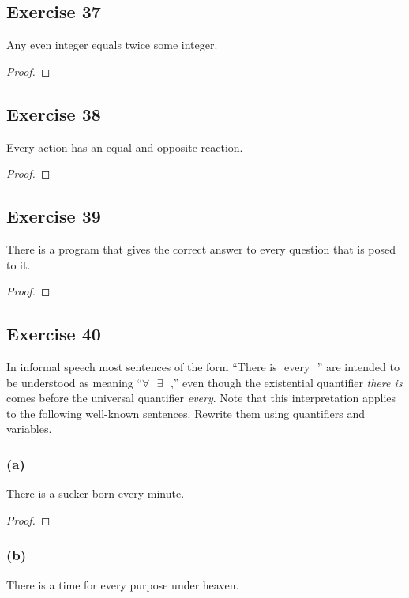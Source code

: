 \documentclass[14pt]{extarticle}
\newcommand{\fbl}{\underline{\hspace{1cm}}\,\,}
\newcommand{\fa}{\forall}
\newcommand{\te}{\exists}
\begin{document}
\subsection{Exercise 37}
Any even integer equals twice some integer.

\begin{proof}

\end{proof}

\subsection{Exercise 38}
Every action has an equal and opposite reaction.

\begin{proof}

\end{proof}

\subsection{Exercise 39}
There is a program that gives the correct answer to every question that is posed to it.

\begin{proof}

\end{proof}

\subsection{Exercise 40}
In informal speech most sentences of the form “There is \fbl every \fbl” are intended to be understood as meaning “$\fa$ \fbl $\te$ \fbl,” even though the existential quantifier {\it there is} comes before the universal quantifier {\it every}. Note that this interpretation applies to the following well-known sentences. Rewrite them using quantifiers and variables.

\subsubsection{(a)}
There is a sucker born every minute.

\begin{proof}

\end{proof}

\subsubsection{(b)}
There is a time for every purpose under heaven.
\end{document}
